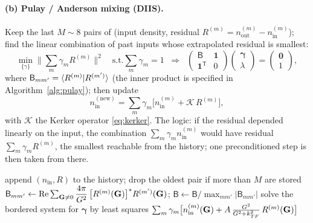 \paragraph{(b) Pulay / Anderson mixing (DIIS).} Keep the last $M \sim 8$
pairs of (input density, residual $R^{(m)} = n_{\mathrm{out}}^{(m)} -
n_{\mathrm{in}}^{(m)}$); find the linear combination of past inputs whose
extrapolated residual is smallest:
\begin{equation}
\min_{\{\gamma\}} \Big\| \sum_m \gamma_m R^{(m)} \Big\|^2
\quad \text{s.t.} \sum_m \gamma_m = 1
\;\;\Longrightarrow\;\;
\begin{pmatrix} \mathsf{B} & \mathbf 1\\ \mathbf 1^{\mathsf T} & 0
\end{pmatrix}
\begin{pmatrix} \bm\gamma \\ \lambda\end{pmatrix}
= \begin{pmatrix}\mathbf 0\\ 1\end{pmatrix},
\end{equation}
where $\mathsf B_{mm'} = \braket{R^{(m)} | R^{(m')}}$ (the inner product
is specified in Algorithm~\ref{alg:pulay}); then update
\begin{equation}
n_{\mathrm{in}}^{(\mathrm{new})}
= \sum_m \gamma_m\Big[ n_{\mathrm{in}}^{(m)}
+ \mathcal K\, R^{(m)} \Big],
\label{eq:pulayupdate}
\end{equation}
with $\mathcal K$ the Kerker operator \eqref{eq:kerker}. The logic: if the
residual depended linearly on the input, the combination
$\sum_m\gamma_m n_{\mathrm{in}}^{(m)}$ would have residual
$\sum_m\gamma_m R^{(m)}$, the smallest reachable from the history; one
preconditioned step is then taken from there.

\begin{algorithm}[H]
\caption{Kerker-preconditioned Pulay mixing (all arrays in Fourier space)}
\label{alg:pulay}
\begin{algorithmic}[1]
\State append $(n_{\mathrm{in}}, R)$ to the history; drop the oldest pair if
more than $M$ are stored
\State $\mathsf B_{mm'} \gets \mathrm{Re}\sum_{\mathbf{G}\ne0}
\dfrac{4\pi}{G^2}\,\big[R^{(m)}(\mathbf{G})\big]^{*} R^{(m')}(\mathbf{G})$;\quad
$\mathsf B \gets \mathsf B/\max_{mm'}|\mathsf B_{mm'}|$
\State solve the bordered system for $\bm\gamma$ by least squares
\State \Return $\sum_m \gamma_m\big[n^{(m)}_{\mathrm{in}}(\mathbf{G})
+ A\,\tfrac{G^2}{G^2+k_{TF}^2}\,R^{(m)}(\mathbf{G})\big]$
\EndFunction
\end{algorithmic}
\end{algorithm}

